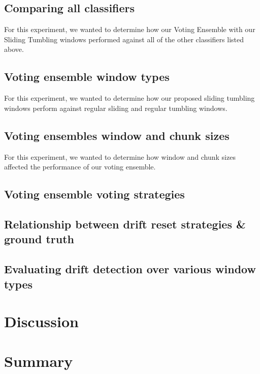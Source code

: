 \subsection{Comparing all classifiers}
For this experiment, we wanted to determine how our Voting Ensemble with our Sliding Tumbling windows performed against all of the other classifiers listed above.

\subsection{Voting ensemble window types}
For this experiment, we wanted to determine how our proposed sliding tumbling windows perform against regular sliding and regular tumbling windows.

\subsection{Voting ensembles window and chunk sizes}
For this experiment, we wanted to determine how window and chunk sizes affected the performance of our voting ensemble. 

\subsection{Voting ensemble voting strategies}


\subsection{Relationship between drift reset strategies \& ground truth}


\subsection{Evaluating drift detection over various window types}


\section{Discussion}

\section{Summary}



